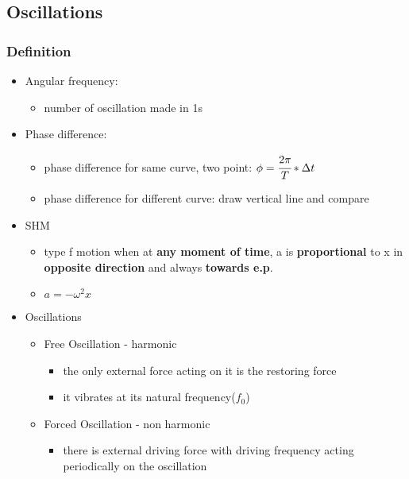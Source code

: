 \documentclass[]{article}
\begin{document}
\subsection{Oscillations}\label{header-n90}

\subsubsection{Definition}\label{header-n91}

\begin{itemize}
\item
  Angular frequency:

  \begin{itemize}
  \item
    number of oscillation made in 1s
  \end{itemize}
\item
  Phase difference:

  \begin{itemize}
  \item
    phase difference for same curve, two point:
    \(\phi= \cfrac{2\pi}{T} * \Delta t\)
  \item
    phase difference for different curve: draw vertical line and compare
  \end{itemize}
\item
  SHM

  \begin{itemize}
  \item
    type f motion when at \textbf{any moment of time}, a is
    \textbf{proportional} to x in \textbf{opposite direction} and always
    \textbf{towards e.p}.
  \item
    \(a = -\omega^2 x\)
  \end{itemize}
\item
  Oscillations

  \begin{itemize}
  \item
    Free Oscillation - harmonic

    \begin{itemize}
    \item
      the only external force acting on it is the restoring force
    \item
      it vibrates at its natural frequency(\(f_0\))
    \end{itemize}
  \item
    Forced Oscillation - non harmonic

    \begin{itemize}
    \item
      there is external driving force with driving frequency acting
      periodically on the oscillation
    \end{itemize}
  \end{itemize}


\end{itemize}
\end{document}
